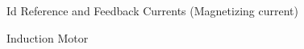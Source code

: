 \begin{frame}{Id Reference and Feedback Currents (Magnetizing current)}
	\begin{figure}
		\centering


	\end{figure}
\end{frame}

\begin{frame}{Induction Motor}
	\begin{figure}
		\centering


	\end{figure}
\end{frame}

